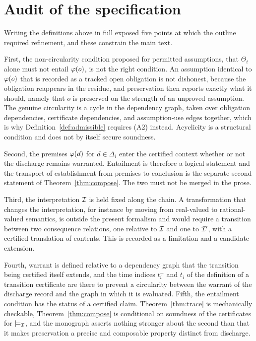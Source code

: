\section{Audit of the specification}
\label{sec:audit}

Writing the definitions above in full exposed five points at which the outline required refinement, and these constrain the main text.

First, the non-circularity condition proposed for permitted assumptions, that $\Theta_i$ alone must not entail $\varphi(o)$, is not the right condition. An assumption identical to $\varphi(o)$ that is recorded as a tracked open obligation is not dishonest, because the obligation reappears in the residue, and preservation then reports exactly what it should, namely that $o$ is preserved on the strength of an unproved assumption. The genuine circularity is a cycle in the dependency graph, taken over obligation dependencies, certificate dependencies, and assumption-use edges together, which is why Definition~\ref{def:admissible} requires (A2) instead. Acyclicity is a structural condition and does not by itself secure soundness.

Second, the premises $\varphi(d)$ for $d \in \Delta_i$ enter the certified context whether or not the discharge remains warranted. Entailment is therefore a logical statement and the transport of establishment from premises to conclusion is the separate second statement of Theorem~\ref{thm:compose}. The two must not be merged in the prose.

Third, the interpretation $\mathcal{I}$ is held fixed along the chain. A transformation that changes the interpretation, for instance by moving from real-valued to rational-valued semantics, is outside the present formalism and would require a transition between two consequence relations, one relative to $\mathcal{I}$ and one to $\mathcal{I}'$, with a certified translation of contents. This is recorded as a limitation and a candidate extension.

Fourth, warrant is defined relative to a dependency graph that the transition being certified itself extends, and the time indices $t_i^-$ and $t_i$ of the definition of a transition certificate are there to prevent a circularity between the warrant of the discharge record and the graph in which it is evaluated. Fifth, the entailment condition has the status of a certified claim. Theorem~\ref{thm:trace} is mechanically checkable, Theorem~\ref{thm:compose} is conditional on soundness of the certificates for $\models_{\mathcal{I}}$, and the monograph asserts nothing stronger about the second than that it makes preservation a precise and composable property distinct from discharge.

